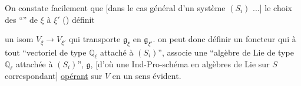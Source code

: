 On constate facilement que [dans le cas général d'un système $(S_i)$ ...]  le choix des  ``'' de $\xi$ à $\xi'$  () définit

un isom $V_\xi\longrightarrow V_{\xi'}$ qui transporte $\mathfrak g_\xi$ en $\mathfrak g_{\xi'}$.  on peut donc définir \unsure{---} un foncteur  qui à tout ``vectoriel de type $\mathbb Q_\ell$ attaché à $(S_i)$'',  associe une ``algèbre de Lie de type $\mathbb Q_\ell$ attachée à $(S_i)$'',  $\mathfrak g$,  [d'où une Ind-Pro-schéma en algèbres de Lie sur $S$ correspondant] \uline{opérant} sur $V$ en un sens évident.

